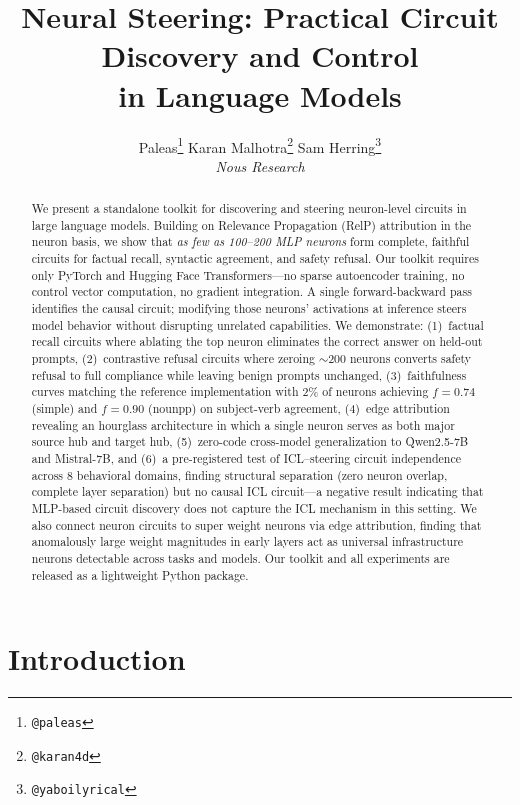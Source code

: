 \documentclass[11pt]{article}
\title{Neural Steering: Practical Circuit Discovery and Control \\ in Language Models}
\author{%
  Paleas\thanks{\texttt{@paleas}}
  \quad
  Karan Malhotra\thanks{\texttt{@karan4d}}
  \quad
  Sam Herring\thanks{\texttt{@yaboilyrical}} \\[6pt]
  \textit{Nous Research}
}
\begin{document}
\maketitle

\begin{abstract}
We present a standalone toolkit for discovering and steering neuron-level circuits in large language models.
Building on Relevance Propagation (RelP) attribution in the neuron basis, we show that \emph{as few as 100--200 MLP neurons} form complete, faithful circuits for factual recall, syntactic agreement, and safety refusal.
Our toolkit requires only PyTorch and Hugging Face Transformers---no sparse autoencoder training, no control vector computation, no gradient integration.
A single forward-backward pass identifies the causal circuit; modifying those neurons' activations at inference steers model behavior without disrupting unrelated capabilities.
We demonstrate: (1)~factual recall circuits where ablating the top neuron eliminates the correct answer on held-out prompts, (2)~contrastive refusal circuits where zeroing ${\sim}200$ neurons converts safety refusal to full compliance while leaving benign prompts unchanged, (3)~faithfulness curves matching the reference implementation with 2\% of neurons achieving $f{=}0.74$ (simple) and $f{=}0.90$ (nounpp) on subject-verb agreement, (4)~edge attribution revealing an hourglass architecture in which a single neuron serves as both major source hub and target hub, (5)~zero-code cross-model generalization to Qwen2.5-7B and Mistral-7B, and (6)~a pre-registered test of ICL--steering circuit independence across 8 behavioral domains, finding structural separation (zero neuron overlap, complete layer separation) but no causal ICL circuit---a negative result indicating that MLP-based circuit discovery does not capture the ICL mechanism in this setting.
We also connect neuron circuits to super weight neurons via edge attribution, finding that anomalously large weight magnitudes in early layers act as universal infrastructure neurons detectable across tasks and models.
Our toolkit and all experiments are released as a lightweight Python package.
\end{abstract}


\section{Introduction}
\label{sec:intro}
\end{document}
